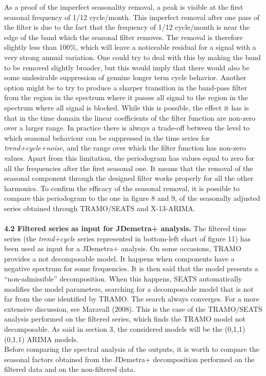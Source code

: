 \documentclass{article}
\begin{document}
As a proof of the imperfect seasonality removal, a peak is visible at the first seasonal frequency of 1/12 cycle/month. This imperfect removal after one pass of the filter is due to the fact that the frequency of 1/12 cycle/month is near the edge of the band which the seasonal filter removes. The removal is therefore slightly less than 100\%, which will leave a noticeable residual for a signal with a very strong annual variation. One could try to deal with this by making the band to be removed slightly broader, but this would imply that there would also be some undesirable suppression of genuine longer term cycle behavior. Another option might be to try to produce a sharper transition in the band-pass filter from the region in the spectrum where it passes all signal to the region in the spectrum where all signal is blocked. While this is possible, the effect it has is that in the time domain the linear coefficients of the filter function are non-zero over a larger range. In practice there is always a trade-off between the level to which seasonal behaviour can be suppressed in the time series for \textit{trend+cycle+noise}, and the range over which the filter function has non-zero values. Apart from this limitation, the periodogram has values equal to zero for all the frequencies after the first seasonal one. It means that the removal of the seasonal component through the designed filter works properly for all the other harmonics. To confirm the efficacy of the seasonal removal, it is possible to compare this periodogram to the one in figure 8 and 9, of the seasonally adjusted series obtained through TRAMO/SEATS and X-13-ARIMA.\\
\bigskip\\
\textbf{\small 4.2 Filtered series as input for JDemetra+ analysis.}
The filtered time series (the \textit{trend+cycle} series represented in bottom-left chart of figure 11) has been used as input for a JDemetra+ analysis. On some occasions, TRAMO provides a not decomposable model. It happens when components have a negative spectrum for some frequencies. It is then said that the model presents a “non-admissible” decomposition. When this happens, SEATS automatically modifies the model parameters, searching for a decomposable model that is not far from the one identified by TRAMO. The search always converges. For a more extensive discussion, see Maravall (2008). This is the case of the TRAMO/SEATS analysis performed on the filtered series, which finds the TRAMO model not decomposable. As said in section 3, the considered models will be the (0,1,1)(0,1,1) ARIMA models.\\ Before comparing the spectral analysis of the outputs, it is worth to compare the seasonal factors obtained from the JDemetra+ decomposition performed on the filtered data and on the non-filtered data.
\end{document}
